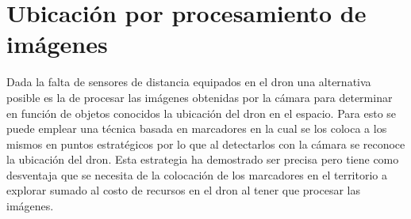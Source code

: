 \section {Ubicación por procesamiento de imágenes}
Dada la falta de sensores de distancia equipados en el dron una alternativa posible es la de procesar las imágenes obtenidas por la cámara para determinar en función de objetos conocidos la ubicación del dron en el espacio.
Para esto se puede emplear una técnica basada en marcadores en la cual se los coloca a los mismos en puntos estratégicos por lo que al detectarlos con la cámara se reconoce la ubicación del dron.
Esta estrategia ha demostrado ser precisa pero tiene como desventaja que se necesita de la colocación de los marcadores en el territorio a explorar sumado al costo de recursos en el dron al tener que procesar las imágenes.
